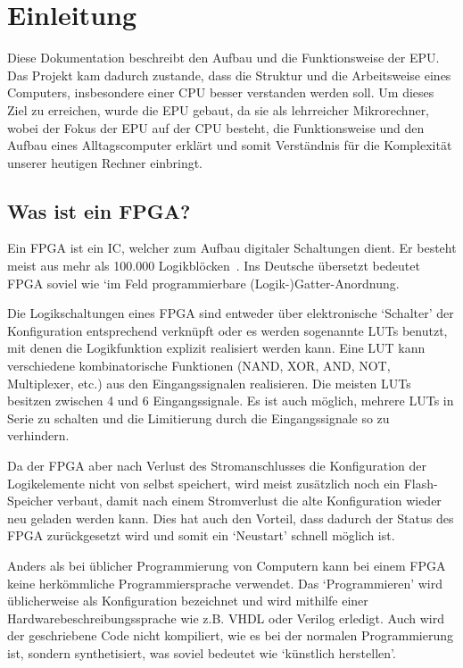 \chapter{Einleitung}
\label{c:einleitung}
Diese Dokumentation beschreibt den Aufbau und die Funktionsweise der \ac{EPU}.
Das Projekt kam dadurch zustande, dass die Struktur und die Arbeitsweise eines
Computers, insbesondere einer \ac{CPU} besser verstanden werden soll. Um dieses
Ziel zu erreichen, wurde die \ac{EPU} gebaut, da sie als lehrreicher
Mikrorechner, wobei der Fokus der \ac{EPU} auf der \ac{CPU} besteht,
die Funktionsweise und den Aufbau eines Alltagscomputer erklärt und somit
Verständnis für die Komplexität unserer heutigen Rechner einbringt.

\section{Was ist ein FPGA?}
Ein \ac{FPGA} ist ein \ac{IC}, welcher zum Aufbau digitaler Schaltungen
dient. Er besteht meist aus mehr als 100.000 Logikblöcken~\cite[S. 8]{minicpu}.
Ins Deutsche übersetzt bedeutet \ac{FPGA} soviel wie `im Feld programmierbare
(Logik-)Gatter-Anordnung.

Die Logikschaltungen eines \ac{FPGA} sind entweder über elektronische `Schalter'
der Konfiguration entsprechend verknüpft oder es werden sogenannte \acp{LUT}
benutzt, mit denen die Logikfunktion explizit realisiert werden kann. Eine
\ac{LUT} kann verschiedene kombinatorische Funktionen (NAND, XOR, AND, NOT,
Multiplexer, etc.) aus den Eingangssignalen realisieren. Die meisten \acp{LUT}
besitzen zwischen 4 und 6 Eingangssignale. Es ist auch möglich, mehrere
\acp{LUT} in Serie zu schalten und die Limitierung durch die Eingangssignale so
zu verhindern.~\cite{FPGA_Aufbau}

Da der \ac{FPGA} aber nach Verlust des Stromanschlusses die Konfiguration der
Logikelemente nicht von selbst speichert, wird meist zusätzlich noch ein
Flash-Speicher verbaut, damit nach einem Stromverlust die alte Konfiguration
wieder neu geladen werden kann. Dies hat auch den Vorteil, dass dadurch der
Status des \ac{FPGA} zurückgesetzt wird und somit ein `Neustart' schnell möglich
ist.

Anders als bei üblicher Programmierung von Computern kann bei einem \ac{FPGA}
keine herkömmliche Programmiersprache verwendet. Das `Programmieren' wird
üblicherweise als Konfiguration bezeichnet und wird mithilfe einer
Hardwarebeschreibungssprache wie z.B. VHDL oder Verilog erledigt. Auch wird der
geschriebene Code nicht kompiliert, wie es bei der normalen Programmierung ist,
sondern synthetisiert, was soviel bedeutet wie `künstlich herstellen'.
